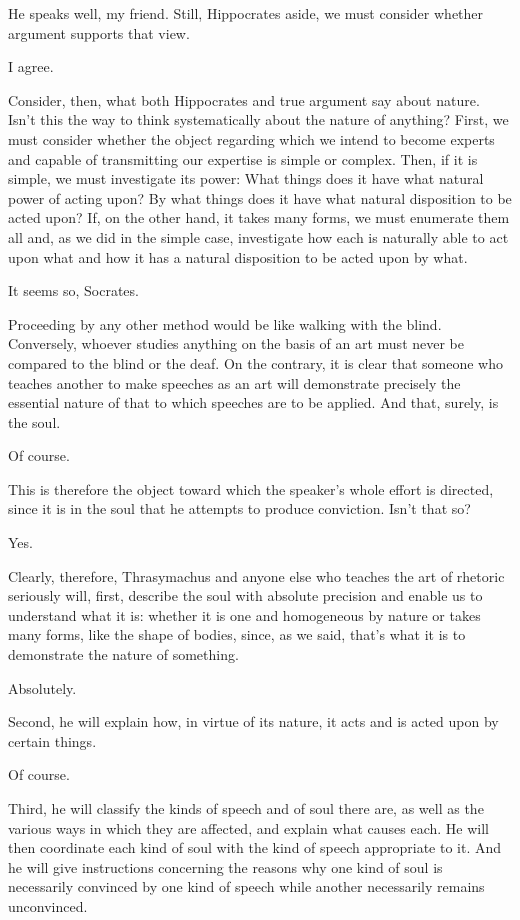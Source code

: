 \saysocrates He speaks well, my friend. Still, Hippocrates aside, we must
consider whether argument supports that view.

\sayphaedrus I agree.

\saysocrates Consider, then, what both Hippocrates and true argument say
about nature. Isn't this the way to think systematically about the
nature of anything? First, we must consider whether the object
regarding which we intend to become experts and capable of transmitting
our expertise is simple or complex. Then, if it is simple, we must
investigate its power: What things does it have what natural power of
acting upon? By what things does it have what natural disposition to be
acted upon? If, on the other hand, it takes many forms, we must
enumerate them all and, as we did in the simple case, investigate how
each is naturally able to act upon what and how it has a natural
disposition to be acted upon by what.

\sayphaedrus It seems so, Socrates.

\saysocrates Proceeding by any other method would be like walking with 
the blind. Conversely, whoever studies anything on the basis of
an art must never be compared to the blind or the deaf. On the contrary,
it is clear that someone who teaches another to make speeches as an art
will demonstrate precisely the essential nature of that to which
speeches are to be applied. And that, surely, is the soul.

\sayphaedrus Of course.

\saysocrates This is therefore the object toward which the speaker's whole effort is directed, since it is in the soul that he
attempts to produce conviction. Isn't that so?

\sayphaedrus Yes.

\saysocrates Clearly, therefore, Thrasymachus and anyone else who teaches
the art of rhetoric seriously will, first, describe the soul with
absolute precision and enable us to understand what it is: whether it is
one and homogeneous by nature or takes many forms, like the shape of
bodies, since, as we said, that's what it is to demonstrate the nature
of something.

\sayphaedrus Absolutely.

\saysocrates Second, he will explain how, in virtue of its nature, it acts
and is acted upon by certain things.

\sayphaedrus Of course.

\saysocrates Third, he will classify the kinds of speech and of
soul there are, as well as the various ways in which they are affected,
and explain what causes each. He will then coordinate each kind of soul
with the kind of speech appropriate to it. And he will give instructions
concerning the reasons why one kind of soul is necessarily convinced by
one kind of speech while another necessarily remains unconvinced.

